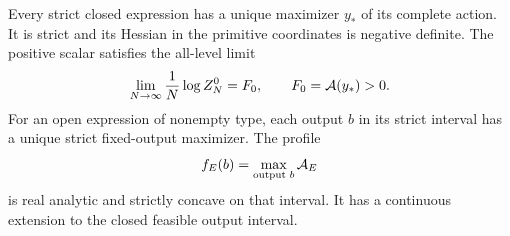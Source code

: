 \begin{theorem}\label{st:positive-action}
Every strict closed expression has a unique maximizer
$y_*$ of its complete action. It is strict and its
Hessian in the primitive coordinates is negative
definite. The positive scalar satisfies the all-level
limit
\begin{equation}\label{st:positive-limit}
 \lim_{N\to\infty}\frac1N\log Z_N^0=F_0,\qquad
 F_0=\mathcal A(y_*)>0 .
\end{equation}
For an open expression of nonempty type, each output
$b$ in its strict interval has a unique strict
fixed-output maximizer. The profile
\[
 f_E(b)=\max_{\text{output }b}\mathcal A_E
\]
is real analytic and strictly concave on that interval.
It has a continuous extension to the closed feasible
output interval.
\end{theorem}
